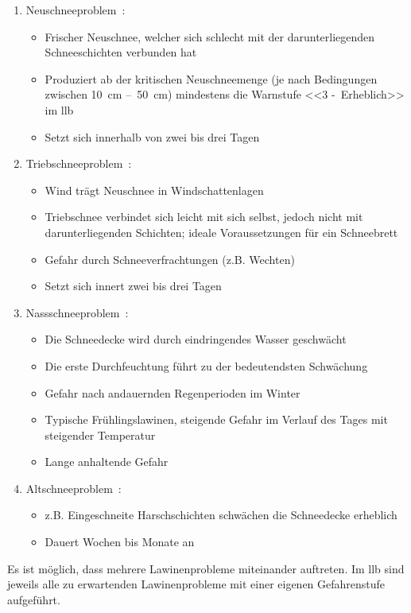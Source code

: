 \begin{enumerate}
  \item Neuschneeproblem~\cite{harveyrhynerschweizerlawinenkunde}\cite{achtunglawine}:
  \begin{itemize}
    \item Frischer Neuschnee, welcher sich schlecht mit der darunterliegenden Schneeschichten verbunden hat
    \item Produziert ab der kritischen Neuschneemenge (je nach Bedingungen zwischen \qty{10}{cm} --~\qty{50}{cm}) mindestens die Warnstufe <<3 -~Erheblich>> im \acrfull{llb}
    \item Setzt sich innerhalb von zwei bis drei Tagen
  \end{itemize}
  \item Triebschneeproblem~\cite{harveyrhynerschweizerlawinenkunde}\cite{achtunglawine}:
  \begin{itemize}
    \item Wind trägt Neuschnee in Windschattenlagen
    \item Triebschnee verbindet sich leicht mit sich selbst, jedoch nicht mit darunterliegenden Schichten; ideale Voraussetzungen für ein Schneebrett
    \item Gefahr durch Schneeverfrachtungen (z.B. Wechten) %
    \item Setzt sich innert zwei bis drei Tagen
  \end{itemize}
  \item Nassschneeproblem~\cite{harveyrhynerschweizerlawinenkunde}\cite{achtunglawine}:
  \begin{itemize}
    \item Die Schneedecke wird durch eindringendes Wasser geschwächt
    \item Die erste Durchfeuchtung führt zu der bedeutendsten Schwächung
    \item Gefahr nach andauernden Regenperioden im Winter
    \item Typische Frühlingslawinen, steigende Gefahr im Verlauf des Tages mit steigender Temperatur
    \item Lange anhaltende Gefahr
  \end{itemize}
  \item Altschneeproblem~\cite{harveyrhynerschweizerlawinenkunde}\cite{achtunglawine}:
  \begin{itemize}
    \item z.B. Eingeschneite Harschschichten schwächen die Schneedecke erheblich
    \item Dauert Wochen bis Monate an
  \end{itemize}
\end{enumerate}
Es ist möglich, dass mehrere Lawinenprobleme miteinander auftreten. Im \gls{llb} sind jeweils alle zu erwartenden Lawinenprobleme mit einer eigenen Gefahrenstufe aufgeführt.~\cite{slfTypischeLawinenprobleme}

